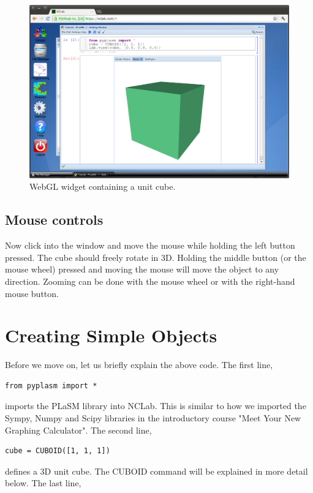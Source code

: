 \documentclass[article,A4,12pt]{llncs}
\begin{document}
\begin{figure}[!ht]
\begin{center}
\includegraphics[width=\textwidth]{img/cube.png}
\end{center}
\caption{WebGL widget containing a unit cube.}
\label{fig:cube}
\end{figure}

\subsection{Mouse controls}

Now click into the window and move the mouse while holding the left
button pressed. The cube should freely rotate in 3D. Holding the middle
button (or the mouse wheel) pressed and moving the mouse will move the 
object to any direction. Zooming can be done with the mouse wheel or
with the right-hand mouse button.

\section{Creating Simple Objects}

Before we move on, let us briefly explain the above code.
The first line, 

\begin{verbatim}
from pyplasm import *
\end{verbatim}
imports the PLaSM library into NCLab. This is similar to how we imported
the Sympy, Numpy and Scipy libraries in the introductory course "Meet Your 
New Graphing Calculator". The second line,

\begin{verbatim}
cube = CUBOID([1, 1, 1])
\end{verbatim}
defines a 3D unit cube. The CUBOID command will be explained in more detail below.
The last line,
\end{document}
